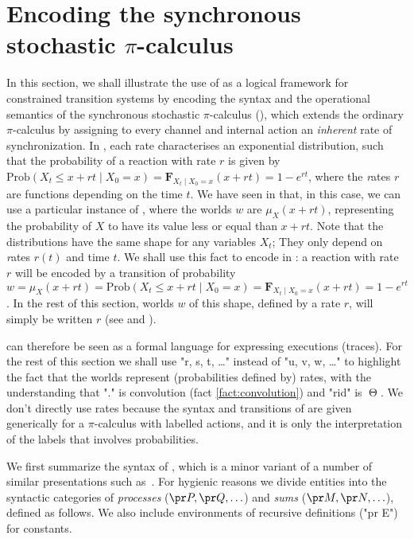 \documentclass{article}
\begin{document}
\section{Encoding the synchronous stochastic $\pi$-calculus}
\label{sec:spi}

In this section, we shall illustrate the use of \hyllp as a logical framework
for constrained transition systems by encoding the syntax and the operational
semantics of the synchronous stochastic $\pi$-calculus (\spi), which extends the
ordinary $\pi$-calculus by assigning to every channel and internal action
an \emph{inherent} rate of synchronization.
In \spi, each rate characterises an exponential distribution\cite{phillips06tcsb}, 
such that the probability of a reaction with rate $r$ 
is given by
$\text{Prob}(X_t \le x + rt \mid X_0=x) = {\mathbf F}_{X_t \mid X_0=x}(x + rt) = 1 - e^{rt}$,
where the {\emph rates} $r$ are functions depending on the time $t$.
We have seen in  that, in this case, we can use 
a particular instance of \hyllp,
where the worlds $w$ are $\mu_X(x+rt)$, 
representing the probability of $X$ to have its value less or equal than $x+rt$.
Note that the distributions have the same shape for any variables $X_t$; 
They only depend on {\emph rates} $r(t)$ and time $t$.
We shall use this fact to encode \spi in \hyllp: 
a \spi reaction with rate $r$ will be encoded by a transition 
of probability 
$w = \mu_X(x + rt) = 
\text{Prob}(X_t \le x + rt \mid X_0=x) = {\mathbf F}_{X_t \mid X_0=x}(x + rt) = 1 - e^{rt}$.
In the rest of this section, worlds $w$ of this shape,
defined by a rate $r$, will simply be written $r$ 
(see  and ).

\hyllp can therefore be seen as a formal language for expressing \spi executions (traces). 
For the rest of this
section we shall use "r, s, t, \ldots" instead of "u, v, w, \ldots" to highlight
the fact that the worlds represent (probabilities defined by) rates, 
with the understanding that "." is convolution (fact \ref{fact:convolution}) 
and "rid" is ${\mathop{\Theta}}$. We don't directly use
rates because the syntax and transitions of \spi are given generically for a
$\pi$-calculus with labelled actions, and it is only the interpretation of the
labels that involves probabilities.

We first summarize the
syntax of \spi, which is a minor variant of a number of similar presentations
such as~\cite{phillips06tcsb}. For hygienic reasons we divide entities into the
syntactic categories of \emph{processes} ($\pr P, \pr Q, \ldots$) and
\emph{sums} ($\pr M, \pr N, \ldots$), defined as follows. We also include
environments of recursive definitions ("pr E") for constants.
\end{document}
